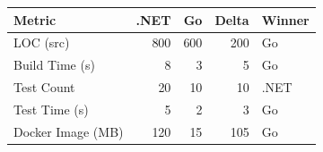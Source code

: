 \begin{tabular}{lrrrl}
\toprule
 Metric            &   .NET &   Go &   Delta & Winner   \\
\midrule
 LOC (src)         &    800 &  600 &     200 & Go       \\
 Build Time (s)    &      8 &    3 &       5 & Go       \\
 Test Count        &     20 &   10 &      10 & .NET     \\
 Test Time (s)     &      5 &    2 &       3 & Go       \\
 Docker Image (MB) &    120 &   15 &     105 & Go       \\
\bottomrule
\end{tabular}